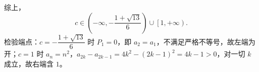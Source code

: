 \begin{answer}
综上，
\nopagebreak[4]
\[c\in\left(-\infty,-\frac{1+\sqrt{13}}{6}\right)\cup\left[1,+\infty\right).\]
检验端点：$c=-\dfrac{1+\sqrt{13}}{6}$ 时 $P_1=0$，即 $a_2=a_1$，不满足严格不等号，故左端为开；$c=1$ 时 $a_n=n^2$，$a_{2k}-a_{2k-1}=4k^2-\left(2k-1\right)^2=4k-1>0$，对一切 $k$ 成立，故右端含 $1$。

\gkanswer{答案：（1）$a_n=(n^2-1)c^n+c^{n-1}$；（2）$c\in\left(-\infty,-\dfrac{1+\sqrt{13}}{6}\right)\cup[1,+\infty)$。}

\end{answer}
